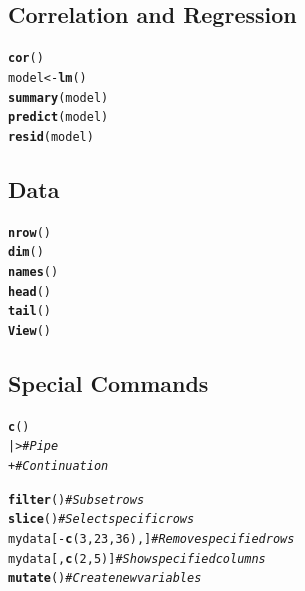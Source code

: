 \documentclass[10pt]{report}\usepackage[]{graphicx}\usepackage[]{xcolor}
\makeatletter
\newcommand{\hlcom}[1]{\textcolor[rgb]{0.678,0.584,0.686}{\textit{#1}}}%
\newcommand{\hldef}[1]{\textcolor[rgb]{0.345,0.345,0.345}{#1}}%
\newcommand{\hlkwb}[1]{\textcolor[rgb]{0.69,0.353,0.396}{#1}}%
\newcommand{\hlkwd}[1]{\textcolor[rgb]{0.737,0.353,0.396}{\textbf{#1}}}%
\newenvironment{kframe}{%
 \def\at@end@of@kframe{}%
 \ifinner\ifhmode%
  \def\at@end@of@kframe{\end{minipage}}%
  \begin{minipage}{\columnwidth}%
 \fi\fi%
 \def\FrameCommand##1{\hskip\@totalleftmargin \hskip-\fboxsep
 \colorbox{shadecolor}{##1}\hskip-\fboxsep
     \hskip-\linewidth \hskip-\@totalleftmargin \hskip\columnwidth}%
 \MakeFramed {\advance\hsize-\width
   \@totalleftmargin\z@ \linewidth\hsize
   \@setminipage}}%
 {\par\unskip\endMakeFramed%
 \at@end@of@kframe}
\newenvironment{knitrout}{}{} %
\makeatother
\begin{document}
\begin{multicols}{3}

\squeeze

\subsection*{Correlation and Regression}
%
\begin{knitrout}
\color{fgcolor}\begin{kframe}
\begin{alltt}
\hlkwd{cor}\hldef{()}
\hldef{model} \hlkwb{<-} \hlkwd{lm}\hldef{()}
\hlkwd{summary}\hldef{(model)}
\hlkwd{predict}\hldef{(model)}
\hlkwd{resid}\hldef{(model)}
\end{alltt}
\end{kframe}
\end{knitrout}


\squeeze
\subsection*{Data}
\begin{knitrout}
\color{fgcolor}\begin{kframe}
\begin{alltt}
\hlkwd{nrow}\hldef{()}
\hlkwd{dim}\hldef{()}
\hlkwd{names}\hldef{()}
\hlkwd{head}\hldef{()}
\hlkwd{tail}\hldef{()}
\hlkwd{View}\hldef{()}
\end{alltt}
\end{kframe}
\end{knitrout}
\squeeze

\subsection*{Special Commands}
\begin{knitrout}
\color{fgcolor}\begin{kframe}
\begin{alltt}
\hlkwd{c}()
 |> \hlcom{# Pipe}
+   \hlcom{# Continuation}

\hlkwd{filter}()               \hlcom{# Subset rows }
\hlkwd{slice}()                \hlcom{# Select specific rows }
mydata[-\hlkwd{c}(3,23,36), ]  \hlcom{# Remove specified rows}
mydata[, \hlkwd{c}(2,5)]       \hlcom{# Show specified columns}
\hlkwd{mutate}()               \hlcom{# Create new variables}
\end{alltt}
\end{kframe}
\end{knitrout}
\squeeze


\end{multicols}
\end{document}
